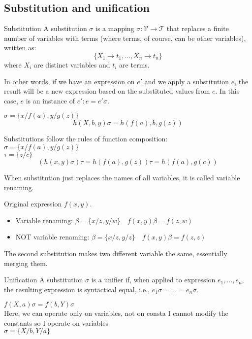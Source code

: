 \documentclass{article}
\begin{document}
\subsection{Substitution and unification}
\begin{Definition}{Substitution}{}
   A substitution $\sigma$ is a mapping $\sigma:\mathcal{V}\to \mathcal{T}$
   that replaces a finite number of variables with terms (where terms, of
   course, can be other variables), written as:
   $$\{X_1\to t_1,\ldots,X_n\to t_n\}$$
   where $X_i$ are distinct variables and $t_i$ are terms.
\end{Definition}
In other words, if we have an expression on $e'$ and we apply a substitution
$e$, the result will be a new expression based on the substituted values from
$e$. In this case, $e$ is an instance of $e':e=e'\sigma$.
\begin{example}
   $\sigma=\{x/f(a), y/g(z)\}$ 
   $$h(X,b,y)\sigma=h(f(a),b,g(z))$$
\end{example}
\begin{example}
    Substitutions follow the rules of function composition:\\
    $\sigma=\{x/f(a), y/g(z)\}$ \\
    $\tau=\{z/c\}$ 
    $$(h(x,y)\sigma)\tau=h(f(a),g(z))\tau=h(f(a),g(c))$$
\end{example}
When substitution just replaces the names of all variables, it is called
variable renaming.
\begin{example}
    Original expression $f(x,y)$.
    \begin{itemize}
        \item Variable renaming: $\beta=\{x/z,y/w\}\quad f(x,y)\beta=f(z,w)$
        \item NOT variable renaming: $\beta=\{x/z,y/z\}\quad f(x,y)\beta=f(z,z)$
    \end{itemize}
    The second substitution makes two different variable the same, essentially
    merging them.
\end{example}
\begin{Definition}{Unification}{}
   A substitution $\sigma$ is a unifier if, when applied to expression
   $e_1,\ldots,e_n$, the resulting expression is syntactical equal, i.e.,
   $e_1\sigma=\ldots=e_n\sigma$. 
\end{Definition}
\begin{example}
   $f(X,a)\sigma=f(b,Y)\sigma$\\
   Here, we can operate only on variables, not on consta
   I cannot modify the constants so I operate on variables\\ 
   $\sigma=\{X/b,Y/a\}$
\end{example}
\end{document}
